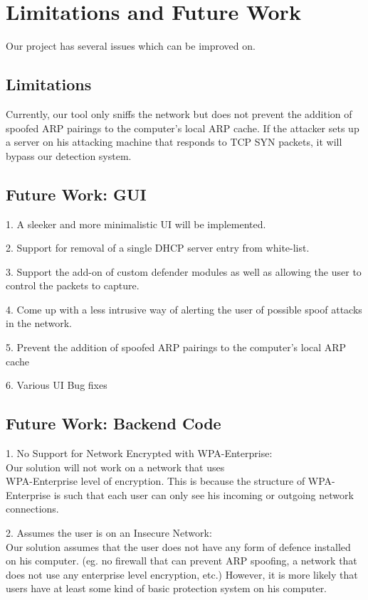 \documentclass{acm_proc_article-sp}
\begin{document}
\section{Limitations and Future Work}
Our project has several issues which can be improved on.

\subsection{Limitations}
Currently, our tool only sniffs the network but does not prevent the addition of spoofed ARP pairings to the computer’s local ARP cache. If the attacker sets up a server on his attacking machine that responds to TCP SYN packets, it will bypass our detection system.

\subsection{Future Work: GUI}
1. A sleeker and more minimalistic UI will be implemented.

2. Support for removal of a single DHCP server entry from white-list.

3. Support the add-on of custom defender modules as well as allowing the user to control the packets to capture.

4. Come up with a less intrusive way of alerting the user of possible spoof attacks in the network.

5. Prevent the addition of spoofed ARP pairings to the computer’s local ARP cache

6. Various UI Bug fixes

\subsection{Future Work: Backend Code}

1. No Support for Network Encrypted with WPA-Enterprise:\\
Our solution will not work on a network that uses\\ WPA-Enterprise level of encryption. This is because the structure of WPA-Enterprise is such that each user can only see his incoming or outgoing network connections. 

2. Assumes the user is on an Insecure Network: \\
Our solution assumes that the user does not have any form of defence installed on his computer. (eg. no firewall that can prevent ARP spoofing, a network that does not use any enterprise level encryption, etc.) However, it is more likely that users have at least some kind of basic protection system on his computer. 
\end{document}
